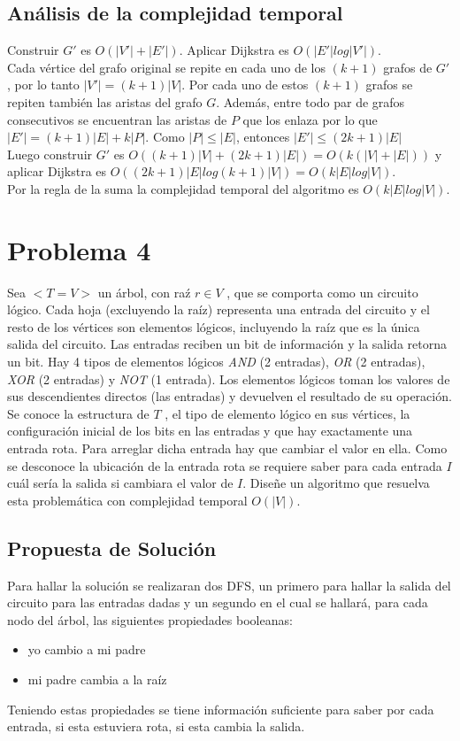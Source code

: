 \documentclass[a4paper,10pt]{article}
\begin{document}
	\subsection{Análisis de la complejidad temporal}
	Construir $G'$ es $O(|V'| + |E'|)$. Aplicar Dijkstra es $O(|E' |log|V'|)$.
	\\Cada vértice del grafo original se repite en cada uno de los $(k+1)$ grafos de $G'$, por lo tanto  $|V'| = (k + 1)|V|$. Por cada uno de estos $(k+1)$ grafos se repiten también las aristas del grafo $G$. Además, entre todo par de grafos consecutivos se encuentran las aristas de $P$ que los enlaza por lo que $|E'|= (k + 1)|E|+ k|P|$. Como  $|P| \leq |E|$, entonces $|E'| \leq (2k+1)|E|$
	\\Luego construir $G'$ es $O((k+1)|V|+(2k+1)|E|)  =  O(k(|V|+|E|))$ y aplicar Dijkstra es	$O((2k + 1)|E|log(k + 1)|V|) = O(k|E|log|V|)$.
	\\Por la regla de la suma la complejidad temporal del algoritmo es $O(k|E|log|V|)$.
	
	
		\section{Problema 4}
	Sea $<T = V>$ un árbol, con ra\'z $r \in V$ , que se comporta como un circuito lógico. Cada hoja (excluyendo la ra\'iz) representa una entrada del circuito y el resto de los vértices son elementos lógicos, incluyendo la ra\'iz que es la única salida del circuito. Las entradas reciben un bit de información y la salida retorna un bit. Hay
	4 tipos de elementos lógicos \emph{AND} (2 entradas), \emph{OR} (2 entradas), \emph{XOR} (2 entradas) y \emph{NOT} (1 entrada). Los elementos lógicos toman los valores de sus descendientes directos (las entradas) y devuelven el resultado de su operación. Se conoce la estructura de $T$ , el tipo de elemento lógico en sus vértices, la configuración inicial de los bits en las entradas y que hay exactamente una entrada rota. Para arreglar dicha entrada hay que cambiar el valor en ella. Como se desconoce la ubicación de la entrada rota se requiere saber para cada entrada $I$ cu\'al	ser\'ia la salida si cambiara el valor de $I$. Diseñe un algoritmo que resuelva esta problemática con complejidad temporal $O(|V |)$.
	
	\subsection{Propuesta de Soluci\'on}
	Para hallar la soluci\'on se realizaran dos DFS, un primero para hallar la salida del circuito para las entradas dadas y un segundo en el cual se hallar\'a, para cada nodo del \'arbol, las siguientes propiedades booleanas:
	\begin{itemize}
		\item yo cambio a mi padre
		\item mi padre cambia a la ra\'iz
	\end{itemize}
	Teniendo estas propiedades se tiene informaci\'on suficiente para saber por cada entrada, si esta estuviera rota, si esta cambia la salida.
	
\end{document}
